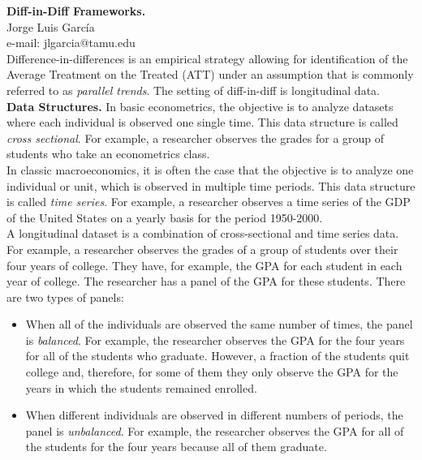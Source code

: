 
\let\counterwithout\relax
\let\counterwithin\relax
{}


\onehalfspacing

\noindent \textbf{Diff-in-Diff Frameworks.}\\
\noindent Jorge Luis García \\
\noindent e-mail: jlgarcia@tamu.edu\\

\noindent Difference-in-differences is an empirical strategy allowing for identification of the Average Treatment on the Treated (ATT) under an assumption that is commonly referred to as \textit{parallel trends}. The setting of diff-in-diff is longitudinal data.\\

\noindent \textbf{Data Structures.} In basic econometrics, the objective is to analyze datasets where each individual is observed one single time. This data structure is called \textit{cross sectional}. For example, a researcher observes the grades for a group of students who take an econometrics class.\\ 

\noindent In classic macroeconomics, it is often the case that the objective is to analyze one individual or unit, which is observed in multiple time periods. This data structure is called \textit{time series}. For example, a researcher observes a time series of the GDP of the United States on a yearly basis for the period 1950-2000.\\

\noindent A longitudinal dataset is a combination of cross-sectional and time series data. For example, a researcher observes the grades of a group of students over their four years of college. They have, for example, the GPA for each student in each year of college. The researcher has a panel of the GPA for these students. There are two types of panels:
\begin{itemize}
\item When all of the individuals are observed the same number of times, the panel is \textit{balanced}. For example, the researcher observes the GPA for the four years for all of the students who graduate. However, a fraction of the students quit college and, therefore, for some of them they only observe the GPA for the years in which the students remained enrolled.  
\item When different individuals are observed in different numbers of periods, the panel is \textit{unbalanced}. For example, the researcher observes the GPA for all of the students for the four years because all of them graduate. 
\end{itemize}

